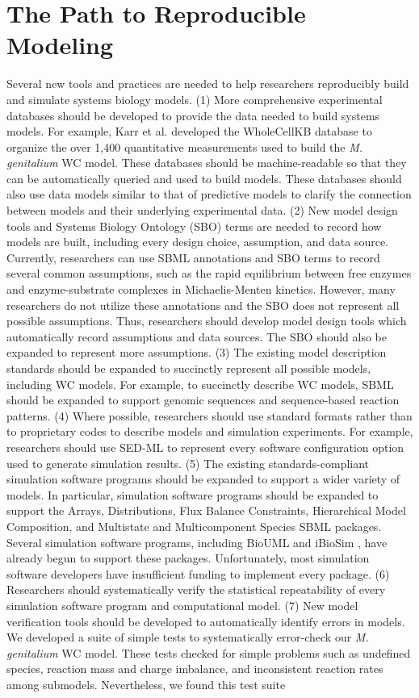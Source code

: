 \documentclass[journal,transmag,twoside]{IEEEtran}
\begin{document}
\section{The Path to Reproducible Modeling}

Several new tools and practices are needed to help researchers reproducibly build and simulate systems biology models. (1) More comprehensive experimental databases should be developed to provide the data needed to build systems models.  For example, Karr et al. developed the WholeCellKB database \cite{karr2013wholecellkb} to organize the over 1,400 quantitative measurements used to build the \textit{M. genitalium} WC model. These databases should be machine-readable so that they can be automatically queried and used to build models. These databases should also use data models similar to that of predictive models to clarify the connection between models and their underlying experimental data. (2) New model design tools and Systems Biology Ontology (SBO) \cite{juty2013systems} terms are needed to record how models are built, including every design choice, assumption, and data source. Currently, researchers can use SBML annotations and SBO terms to record several common assumptions, such as the rapid equilibrium between free enzymes and enzyme-substrate complexes in Michaelis-Menten kinetics. However, many researchers do not utilize these annotations and the SBO does not represent all possible assumptions. Thus, researchers should develop model design tools which automatically record assumptions and data sources. The SBO should also be expanded to represent more assumptions. (3) The existing model description standards should be expanded to succinctly represent all possible models, including WC models. For example, to succinctly describe WC models, SBML should be expanded to support genomic sequences and sequence-based reaction patterns. (4) Where possible, researchers should use standard formats rather than to proprietary codes to describe models and simulation experiments. For example, researchers should use SED-ML to represent every software configuration option used to generate simulation results. (5) The existing standards-compliant simulation software programs should be expanded to support a wider variety of models. In particular, simulation software programs should be expanded to support the Arrays, Distributions, Flux Balance Constraints, Hierarchical Model Composition, and Multistate and Multicomponent Species SBML packages. Several simulation software programs, including BioUML \cite{Kolpakov2006} and iBioSim \cite{Stevens2013}, have already begun to support these packages. Unfortunately, most simulation software developers have insufficient funding to implement every package. (6) Researchers should systematically verify the statistical repeatability of every simulation software program and computational model. (7) New model verification tools should be developed to automatically identify errors in models. We developed a suite of simple tests to systematically error-check our \textit{M. genitalium} WC model. These tests checked for simple problems such as undefined species, reaction mass and charge imbalance, and inconsistent reaction rates among submodels. Nevertheless, we found this test suite 
\end{document}
